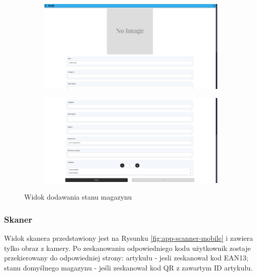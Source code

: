 \documentclass[../main.tex]{subfiles}
\begin{document}
            \begin{figure}[H]
                \begin{subfigure}{.49\textwidth}
                    \centering
                    \includegraphics[width=\getImageWidth]{images/app-desktop/app-stock-add1-desktop.png}
                    \label{fig:app-stock-add1-desktop}
                \end{subfigure}
                \begin{subfigure}{.49\textwidth}
                    \centering
                    \includegraphics[width=\getImageWidth]{images/app-desktop/app-stock-add2-desktop.png}
                    \label{fig:app-stock-add2-desktop}
                \end{subfigure}
                \caption{Widok dodawania stanu magazynu}
                \label{fig:app-stock-add-desktop}
            \end{figure}

        \FloatBarrier 
        \subsubsection{Skaner}
            Widok skanera przedstawiony jest na Rysunku \ref{fig:app-scanner-mobile} i zawiera tylko obraz z kamery. Po zeskanowaniu odpowiedniego kodu użytkownik zostaje przekierowany do odpowiedniej strony: artykułu - jesli zeskanował kod EAN13; stanu domyślnego magazynu - jeśli zeskanował kod QR z zawartym ID artykułu.
\end{document}

